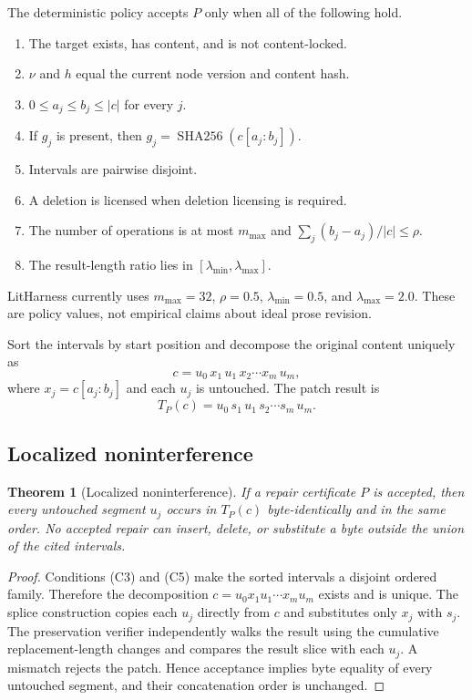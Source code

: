 \documentclass[11pt]{article}
\newtheorem{theorem}[definition]{Theorem}
\newcommand{\sha}{\operatorname{SHA256}}
\begin{document}
The deterministic policy accepts $P$ only when all of the following hold.

\begin{enumerate}[label=(C\arabic*)]
  \item The target exists, has content, and is not content-locked.
  \item $\nu$ and $h$ equal the current node version and content hash.
  \item $0\le a_j\le b_j\le |c|$ for every $j$.
  \item If $g_j$ is present, then $g_j=\sha(c[a_j:b_j])$.
  \item Intervals are pairwise disjoint.
  \item A deletion is licensed when deletion licensing is required.
  \item The number of operations is at most $m_{\max}$ and
  $\sum_j(b_j-a_j)/|c|\le\rho$.
  \item The result-length ratio lies in $[\lambda_{\min},\lambda_{\max}]$.
\end{enumerate}

LitHarness currently uses $m_{\max}=32$, $\rho=0.5$,
$\lambda_{\min}=0.5$, and $\lambda_{\max}=2.0$. These are policy values, not empirical
claims about ideal prose revision.

Sort the intervals by start position and decompose the original content uniquely as
\[
 c=u_0\,x_1\,u_1\,x_2\cdots x_m\,u_m,
\]
where $x_j=c[a_j:b_j]$ and each $u_j$ is untouched. The patch result is
\[
 T_P(c)=u_0\,s_1\,u_1\,s_2\cdots s_m\,u_m.
\]

\subsection{Localized noninterference}

\begin{theorem}[Localized noninterference]
\label{thm:noninterference}
If a repair certificate $P$ is accepted, then every untouched segment $u_j$ occurs in
$T_P(c)$ byte-identically and in the same order. No accepted repair can insert, delete, or
substitute a byte outside the union of the cited intervals.
\end{theorem}

\begin{proof}
Conditions (C3) and (C5) make the sorted intervals a disjoint ordered family. Therefore the
decomposition $c=u_0x_1u_1\cdots x_mu_m$ exists and is unique. The splice construction copies
each $u_j$ directly from $c$ and substitutes only $x_j$ with $s_j$. The preservation verifier
independently walks the result using the cumulative replacement-length changes and compares
the result slice with each $u_j$. A mismatch rejects the patch. Hence acceptance implies
byte equality of every untouched segment, and their concatenation order is unchanged.
\end{proof}
\end{document}
